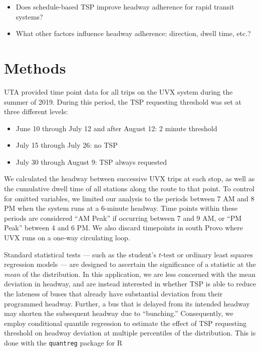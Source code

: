 \documentclass[3p, authoryear, review]{elsarticle} %
\providecommand{\tightlist}{%
  \setlength{\itemsep}{0pt}\setlength{\parskip}{0pt}}
\begin{document}
\begin{itemize}
\tightlist
\item
  Does schedule-based TSP improve headway adherence for rapid transit systems?
\item
  What other factors influence headway adherence: direction, dwell time, etc.?
\end{itemize}

\hypertarget{methods}{%
\section{Methods}\label{methods}}

UTA provided time point data for all trips on the UVX system during the summer
of 2019. During this period, the TSP requesting threshold was set at three
different levels:

\begin{itemize}
\tightlist
\item
  June 10 through July 12 and after August 12: 2 minute threshold
\item
  July 15 through July 26: no TSP
\item
  July 30 through August 9: TSP always requested
\end{itemize}

We calculated the headway between successive UVX trips at each stop, as
well as the cumulative dwell time of all stations along the route to that point.
To control for omitted variables, we limited our analysis to the periods
between 7 AM and 8 PM when the system runs at a 6-minute headway. Time points
within these periods are considered ``AM Peak'' if occurring between 7 and 9 AM,
or ``PM Peak'' between 4 and 6 PM. We also discard timepoints in south Provo where
UVX runs on a one-way circulating loop.

Standard statistical tests --- such as the student's \(t\)-test or
ordinary least squares regression models --- are designed to ascertain the
significance of a statistic at the \emph{mean} of the distribution. In this
application, we are less concerned with the mean deviation in headway, and are
instead interested in whether TSP is able to reduce the lateness of buses that
already have substantial deviation from their programmed headway. Further, a bus
that is delayed from its intended headway may shorten the subsequent headway due
to ``bunching.'' Consequently, we employ conditional quantile regression
\citep{koenker2001quantile} to estimate the effect of TSP requesting threshold on
headway deviation at multiple percentiles of the distribution. This is
done with the \texttt{quantreg} package for R \citep{quantreg, R}
\end{document}
